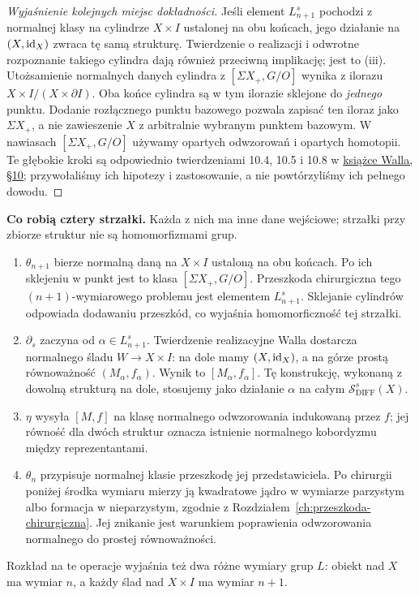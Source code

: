 \begin{proof}[Wyjaśnienie kolejnych miejsc dokładności]
Jeśli element $L_{n+1}^s$ pochodzi
z normalnej klasy na cylindrze
$X\times I$ ustalonej na obu końcach,
jego działanie na $(X,\mathrm{id}_X)$
zwraca tę samą strukturę.
Twierdzenie o realizacji i
odwrotne rozpoznanie takiego
cylindra dają również przeciwną
implikację; jest to (iii).
Utożsamienie normalnych danych cylindra
z $[\Sigma X_+,G/O]$ wynika
z ilorazu $X\times I/(X\times\partial I)$.
Oba końce cylindra są w tym ilorazie sklejone
do \emph{jednego} punktu. Dodanie rozłącznego punktu
bazowego pozwala zapisać ten iloraz jako
$\Sigma X_+$, a nie zawieszenie
$X$ z arbitralnie wybranym punktem bazowym.
W nawiasach $[\Sigma X_+,G/O]$ używamy opartych
odwzorowań i opartych homotopii.
Te głębokie kroki są odpowiednio
twierdzeniami 10.4, 10.5 i 10.8 w
\href{https://webhomes.maths.ed.ac.uk/~v1ranick/books/scm.pdf}
{książce Walla, §10}; przywołaliśmy
ich hipotezy i zastosowanie, a nie
powtórzyliśmy ich pełnego dowodu.
\end{proof}

\noindent\textbf{Co robią cztery strzałki.}
Każda z nich ma inne dane wejściowe;
strzałki przy zbiorze struktur nie są
homomorfizmami grup.
\begin{enumerate}[label=(\roman*)]
\item $\theta_{n+1}$ bierze normalną daną
      na $X\times I$ ustaloną na obu końcach.
      Po ich sklejeniu w punkt jest to klasa
      $[\Sigma X_+,G/O]$. Przeszkoda chirurgiczna
      tego $(n+1)$-wymiarowego problemu jest
      elementem $L_{n+1}^s$. Sklejanie cylindrów
      odpowiada dodawaniu przeszkód, co wyjaśnia
      homomorficzność tej strzałki.
\item $\partial_{\!s}$ zaczyna od
      $\alpha\in L_{n+1}^s$.
      Twierdzenie realizacyjne Walla dostarcza
      normalnego śladu $W\to X\times I$:
      na dole mamy $(X,\mathrm{id}_X)$, a na górze
      prostą równoważność $(M_\alpha,f_\alpha)$.
      Wynik to $[M_\alpha,f_\alpha]$.
      Tę konstrukcję, wykonaną z dowolną
      strukturą na dole, stosujemy jako działanie
      $\alpha$ na całym
      $\mathcal S^s_{\mathrm{DIFF}}(X)$.
\item $\eta$ wysyła $[M,f]$ na klasę
      normalnego odwzorowania indukowaną
      przez $f$; jej równość dla dwóch struktur
      oznacza istnienie normalnego kobordyzmu
      między reprezentantami.
\item $\theta_n$ przypisuje normalnej klasie
      przeszkodę jej przedstawiciela.
      Po chirurgii poniżej środka wymiaru
      mierzy ją kwadratowe jądro w wymiarze
      parzystym albo formacja w nieparzystym,
      zgodnie z Rozdziałem~\ref{ch:przeszkoda-chirurgiczna}.
      Jej znikanie jest warunkiem poprawienia
      odwzorowania normalnego do prostej równoważności.
\end{enumerate}
Rozkład na te operacje wyjaśnia też dwa
różne wymiary grup $L$: obiekt nad $X$
ma wymiar $n$, a każdy ślad nad $X\times I$
ma wymiar $n+1$.

